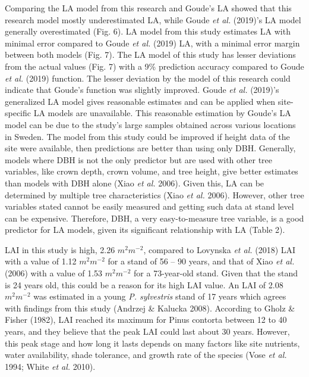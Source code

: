 \documentclass[11pt, a4paper]{report}
\begin{document}
Comparing the LA model from this research and Goude’s LA showed that this research model mostly underestimated LA, while Goude \textit{et al.} (2019)’s LA model generally overestimated (Fig. 6). LA model from this study estimates LA with minimal error compared to Goude \textit{et al.} (2019) LA, with a minimal error margin between both models (Fig. 7). The LA model of this study has lesser deviations from the actual values (Fig. 7) with a 9\% prediction accuracy compared to Goude \textit{et al.} (2019) function. The lesser deviation by the model of this research could indicate that Goude’s function was slightly improved. Goude \textit{et al.} (2019)’s generalized LA model gives reasonable estimates and can be applied when site-specific LA models are unavailable. This reasonable estimation by Goude’s LA model can be due to the study's large samples obtained across various locations in Sweden. The model from this study could be improved if height data of the site were available, then predictions are better than using only DBH. Generally, models where DBH is not the only predictor but are used with other tree variables, like crown depth, crown volume, and tree height, give better estimates than models with DBH alone (Xiao \textit{et al.} 2006). Given this, LA can be determined by multiple tree characteristics (Xiao \textit{et al.} 2006). However, other tree variables stated cannot be easily measured and getting such data at stand level can be expensive. Therefore, DBH, a very easy-to-measure tree variable, is a good predictor for LA models, given its significant relationship with LA (Table 2).

LAI in this study is high, 2.26 $m^{2}m^{-2}$, compared to Lovynska \textit{et al.} (2018) LAI with a value of 1.12 $m^{2}m^{-2}$ for a stand of 56 – 90 years, and that of Xiao \textit{et al.} (2006) with a value of 1.53 $m^2m^{-2}$ for a 73-year-old stand. Given that the stand is 24 years old, this could be a reason for its high LAI value. An LAI of 2.08 $m^{2}m^{-2}$ was estimated in a young \textit{P. sylvestris} stand of 17 years which agrees with findings from this study (Andrzej \& Kalucka 2008). According to Gholz \& Fisher (1982), LAI reached its maximum for Pinus contorta between 12 to 40 years, and they believe that the peak LAI could last about 30 years. However, this peak stage and how long it lasts depends on many factors like site nutrients, water availability, shade tolerance, and growth rate of the species (Vose \textit{et al.} 1994; White \textit{et al.} 2010).
\end{document}
